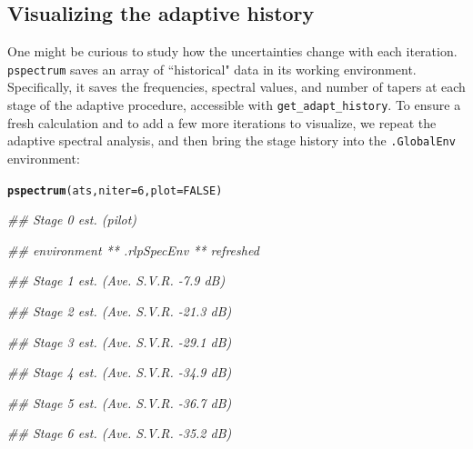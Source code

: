 \documentclass{article}\usepackage{graphicx, color}
\makeatletter
\newcommand{\hlfunctioncall}[1]{\textcolor[rgb]{0.501960784313725,0,0.329411764705882}{\textbf{#1}}}%
\newenvironment{kframe}{%
 \def\at@end@of@kframe{}%
 \ifinner\ifhmode%
  \def\at@end@of@kframe{\end{minipage}}%
  \begin{minipage}{\columnwidth}%
 \fi\fi%
 \def\FrameCommand##1{\hskip\@totalleftmargin \hskip-\fboxsep
 \colorbox{shadecolor}{##1}\hskip-\fboxsep
     \hskip-\linewidth \hskip-\@totalleftmargin \hskip\columnwidth}%
 \MakeFramed {\advance\hsize-\width
   \@totalleftmargin\z@ \linewidth\hsize
   \@setminipage}}%
 {\par\unskip\endMakeFramed%
 \at@end@of@kframe}
\newenvironment{knitrout}{}{} %
\newcommand{\Rcmd}[1]{\texttt{#1}}
\makeatother
\begin{document}
\subsection{Visualizing the adaptive history}
One might be curious to study how the
uncertainties change with each iteration.
\Rcmd{pspectrum}
 saves an array of ``historical" data in its working environment.
 Specifically, it saves the frequencies,
 spectral values, and number of tapers at each stage of the adaptive
 procedure, accessible with \Rcmd{get\_adapt\_history}.
 To ensure a fresh calculation and to 
 add a few more iterations to visualize, 
we repeat the adaptive spectral analysis, 
and then bring the stage history into the \Rcmd{.GlobalEnv} environment:
\begin{knitrout}
\color{fgcolor}\begin{kframe}
\begin{alltt}
\hlfunctioncall{pspectrum}(ats, niter = 6, plot = FALSE)
\end{alltt}


{\ttfamily\noindent\itshape\textcolor{messagecolor}{\#\# Stage  0 est. (pilot)}}

{\ttfamily\noindent\itshape\textcolor{messagecolor}{\#\# 	environment  ** .rlpSpecEnv **  refreshed}}

{\ttfamily\noindent\itshape\textcolor{messagecolor}{\#\# Stage  1 est. (Ave. S.V.R. -7.9 dB)}}

{\ttfamily\noindent\itshape\textcolor{messagecolor}{\#\# Stage  2 est. (Ave. S.V.R. -21.3 dB)}}

{\ttfamily\noindent\itshape\textcolor{messagecolor}{\#\# Stage  3 est. (Ave. S.V.R. -29.1 dB)}}

{\ttfamily\noindent\itshape\textcolor{messagecolor}{\#\# Stage  4 est. (Ave. S.V.R. -34.9 dB)}}

{\ttfamily\noindent\itshape\textcolor{messagecolor}{\#\# Stage  5 est. (Ave. S.V.R. -36.7 dB)}}

{\ttfamily\noindent\itshape\textcolor{messagecolor}{\#\# Stage  6 est. (Ave. S.V.R. -35.2 dB)}}


\end{kframe}
\end{knitrout}
\end{document}
